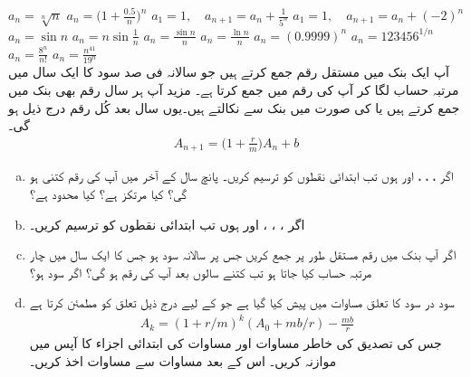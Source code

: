 $a_n=\sqrt[n]{n}$
$a_n=\big(1+\frac{0.5}{n}\big)^n$
$a_1=1,\quad a_{n+1}=a_n+\frac{1}{5^n}$
$a_1=1,\quad a_{n+1}=a_n+(-2)^n$
$a_n=\sin n$
$a_n=n\sin\frac{1}{n}$
$a_n=\frac{\sin n}{n}$
$a_n=\frac{\ln n}{n}$
$a_n=(0.9999)^n$
$a_n=123456^{1/n}$
$a_n=\frac{8^n}{n!}$
$a_n=\frac{n^{41}}{19^n}$
\\
آپ ایک بنک میں مستقل رقم  جمع کرتے ہیں  جو سالانہ  فی صد سود کا ایک سال میں  مرتبہ حساب لگا کر  آپ کی رقم میں جمع کرتا ہے۔ مزید آپ ہر سال  رقم بھی  بنک میں جمع کرتے ہیں یا  کی صورت میں بنک سے نکالتے ہیں۔یوں  سال بعد کُل رقم درج ذیل ہو گی۔
\begin{align}\label{مساوات_تسلسل_سود_در_سود_الف}
A_{n+1}=\big(1+\frac{r}{m}\big)A_n+b
\end{align}
\begin{enumerate}[a.]
\item
اگر ، ، ،  اور  ہوں تب ابتدائی  نقطوں  کو ترسیم کریں۔ پانچ سال کے آخر میں آپ کی رقم کتنی ہو گی؟ کیا  مرتکز ہے؟ کیا  محدود ہے؟
\item
اگر ، ، ،  اور  ہوں تب ابتدائی  نقطوں  کو ترسیم کریں۔
\item
اگر آپ بنک میں  رقم مستقل طور پر جمع کریں جس  پر سالانہ  سود ہو جس کا ایک سال میں چار مرتبہ  حساب کیا جاتا ہو تب کتنے سالوں بعد آپ کی رقم  ہو گی؟ اگر سود  ہو؟
\item
سود در سود کا تعلق مساوات  میں پیش کیا گیا ہے جو  کے لیے درج ذیل تعلق کو مطمئن کرتا ہے
\begin{align}\label{مساوات_تسلسل_سود_در_سود_ب}
A_k=(1+r/m)^k(A_0+mb/r)-\frac{mb}{r}
\end{align}
جس کی تصدیق کی خاطر مساوات  اور مساوات  کی ابتدائی  اجزاء کا آپس میں موازنہ کریں۔ اس کے بعد مساوات  سے مساوات  اخذ کریں۔
\end{enumerate}
